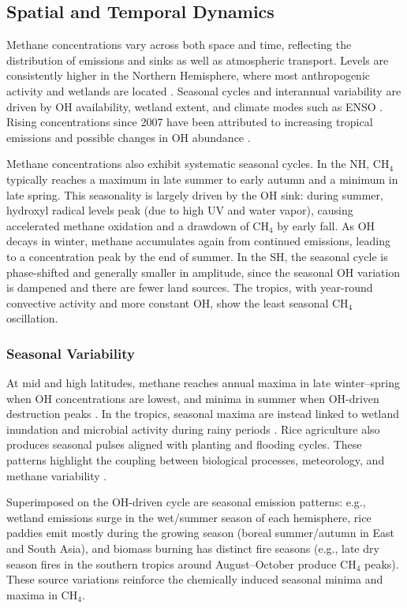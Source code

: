 \subsection{Spatial and Temporal Dynamics}

Methane concentrations vary across both space and time, reflecting the distribution of emissions and sinks as well as atmospheric transport. Levels are consistently higher in the Northern Hemisphere, where most anthropogenic activity and wetlands are located \cite{Karoff2023}. Seasonal cycles and interannual variability are driven by OH availability, wetland extent, and climate modes such as ENSO \cite{Pandey2017, feng_tropical_2022}. Rising concentrations since 2007 have been attributed to increasing tropical emissions and possible changes in OH abundance \cite{Lan2025}.

Methane concentrations also exhibit systematic seasonal cycles. In the NH, CH$_4$ typically reaches a maximum in late summer to early autumn and a minimum in late spring. This seasonality is largely driven by the OH sink: during summer, hydroxyl radical levels peak (due to high UV and water vapor), causing accelerated methane oxidation and a drawdown of CH$_4$ by early fall. As OH decays in winter, methane accumulates again from continued emissions, leading to a concentration peak by the end of summer. In the SH, the seasonal cycle is phase-shifted and generally smaller in amplitude, since the seasonal OH variation is dampened and there are fewer land sources. The tropics, with year-round convective activity and more constant OH, show the least seasonal CH$_4$ oscillation.

\subsubsection{Seasonal Variability} 
At mid and high latitudes, methane reaches annual maxima in late winter--spring when OH concentrations are lowest, and minima in summer when OH-driven destruction peaks \cite{Saunois2020}. In the tropics, seasonal maxima are instead linked to wetland inundation and microbial activity during rainy periods \cite{Pandey2017}. Rice agriculture also produces seasonal pulses aligned with planting and flooding cycles. These patterns highlight the coupling between biological processes, meteorology, and methane variability \cite{Knox2024, Yuan2022}.

Superimposed on the OH-driven cycle are seasonal emission patterns: e.g., wetland emissions surge in the wet/summer season of each hemisphere, rice paddies emit mostly during the growing season (boreal summer/autumn in East and South Asia), and biomass burning has distinct fire seasons (e.g., late dry season fires in the southern tropics around August--October produce CH$_4$ peaks). These source variations reinforce the chemically induced seasonal minima and maxima in CH$_4$.

